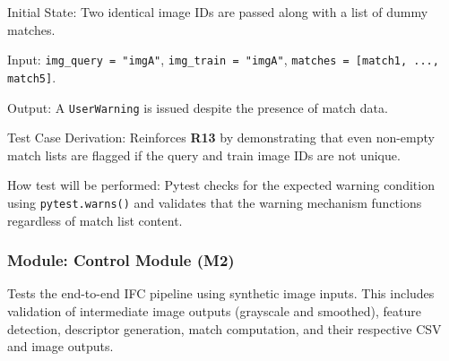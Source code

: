\documentclass[12pt, titlepage]{article}
\begin{document}
\begin{enumerate}
Initial State: Two identical image IDs are passed along with a list of dummy matches.

Input: \texttt{img\_query = "imgA"}, \texttt{img\_train = "imgA"}, \texttt{matches = [match1, ..., match5]}.

Output: A \texttt{UserWarning} is issued despite the presence of match data.

Test Case Derivation: Reinforces \textbf{R13} by demonstrating that even non-empty match lists are flagged if the query and train image IDs are not unique.

How test will be performed: Pytest checks for the expected warning condition using \texttt{pytest.warns()} and validates that the warning mechanism functions regardless of match list content.

\end{enumerate}


\subsubsection{Module: Control Module (M2)}
Tests the end-to-end IFC pipeline using synthetic image inputs. This includes validation of intermediate image outputs (grayscale and smoothed), feature detection, descriptor generation, match computation, and their respective CSV and image outputs.
  
\end{document}
